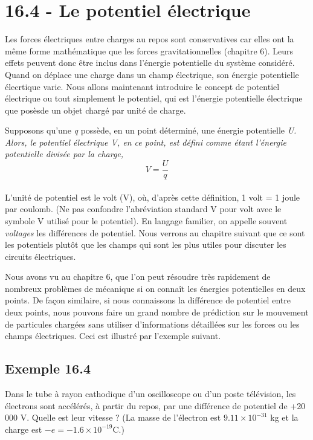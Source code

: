 \documentclass[../main.tex]{subfiles}
\begin{document}
\section{16.4 - Le potentiel électrique}
Les forces électriques entre charges au repos sont conservatives car elles ont la même forme mathématique que les forces gravitationnelles (chapitre 6). Leurs effets peuvent donc être inclus dans l'énergie potentielle du système considéré. Quand on déplace une charge dans un champ électrique, son énergie potentielle élecrtique varie. Nous allons maintenant introduire le concept de potentiel électrique ou tout simplement le potentiel, qui est l'énergie potentielle électrique que posèsde un objet chargé par unité de charge. \\
\par Supposons qu'une \textit{q} possède, en un point déterminé, une énergie potentielle \textit{U. Alors, le potentiel électrique V, en ce point, est défini comme étant l'énergie potentielle divisée par la charge,\\

$$V = \frac{U}{q}$$}\\

L'unité de potentiel est le volt (V), où, d'après cette définition, 1 volt = 1 joule par coulomb. (Ne pas confondre l'abréviation standard V pour volt avec le symbole V utilisé pour le potentiel). En langage familier, on appelle souvent \textit{voltages} les différences de potentiel. Nous verrons au chapitre suivant que ce sont les potentiels plutôt que les champs qui sont les plus utiles pour discuter les circuits électriques.\\
\par Nous avons vu au chapitre 6, que l'on peut résoudre très rapidement de nombreux problèmes de mécanique si on connaît  les énergies potentielles en deux points. De façon similaire, si nous connaissons la différence de potentiel entre deux points, nous pouvons faire un grand nombre de prédiction sur le mouvement de particules chargées sans utiliser d'informations détaillées sur les forces ou les champs électriques. Ceci est illustré par l'exemple suivant.\\
\subsection{Exemple 16.4}
Dans le tube à rayon cathodique d'un oscilloscope ou d'un poste télévision, les électrons sont accélérés, à partir du repos, par une différence de potentiel de +20 000 V. Quelle est leur vitesse ? (La masse de l'électron est $9.11 \times 10^{-31}$ kg et la charge est $-e = -1.6 \times 10^{-19}$C.) \\
\end{document}
